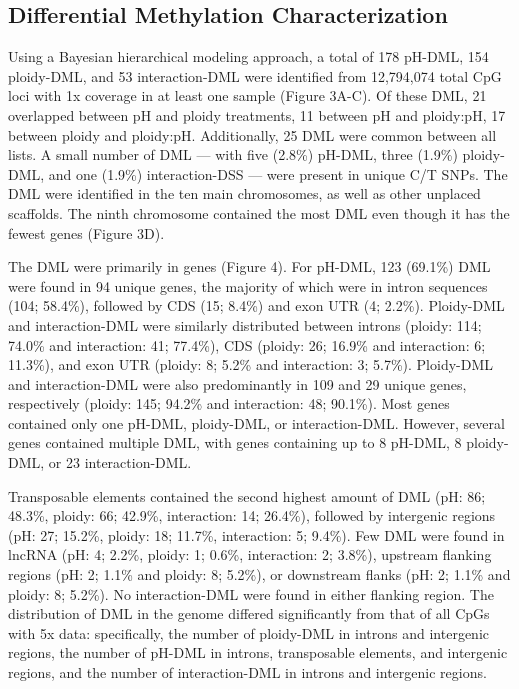 \documentclass [11pt, proquest] {uwthesis}[2015/03/03]
\begin{document}
\hypertarget{differential-methylation-characterization}{%
\subsection{Differential Methylation Characterization}\label{differential-methylation-characterization}}

Using a Bayesian hierarchical modeling approach, a total of 178 pH-DML, 154 ploidy-DML, and 53 interaction-DML were identified from 12,794,074 total CpG loci with 1x coverage in at least one sample (Figure 3A-C). Of these DML, 21 overlapped between pH and ploidy treatments, 11 between pH and ploidy:pH, 17 between ploidy and ploidy:pH. Additionally, 25 DML were common between all lists. A small number of DML --- with five (2.8\%) pH-DML, three (1.9\%) ploidy-DML, and one (1.9\%) interaction-DSS --- were present in unique C/T SNPs. The DML were identified in the ten main chromosomes, as well as other unplaced scaffolds. The ninth chromosome contained the most DML even though it has the fewest genes (Figure 3D).

The DML were primarily in genes (Figure 4). For pH-DML, 123 (69.1\%) DML were found in 94 unique genes, the majority of which were in intron sequences (104; 58.4\%), followed by CDS (15; 8.4\%) and exon UTR (4; 2.2\%). Ploidy-DML and interaction-DML were similarly distributed between introns (ploidy: 114; 74.0\% and interaction: 41; 77.4\%), CDS (ploidy: 26; 16.9\% and interaction: 6; 11.3\%), and exon UTR (ploidy: 8; 5.2\% and interaction: 3; 5.7\%). Ploidy-DML and interaction-DML were also predominantly in 109 and 29 unique genes, respectively (ploidy: 145; 94.2\% and interaction: 48; 90.1\%). Most genes contained only one pH-DML, ploidy-DML, or interaction-DML. However, several genes contained multiple DML, with genes containing up to 8 pH-DML, 8 ploidy-DML, or 23 interaction-DML.

Transposable elements contained the second highest amount of DML (pH: 86; 48.3\%, ploidy: 66; 42.9\%, interaction: 14; 26.4\%), followed by intergenic regions (pH: 27; 15.2\%, ploidy: 18; 11.7\%, interaction: 5; 9.4\%). Few DML were found in lncRNA (pH: 4; 2.2\%, ploidy: 1; 0.6\%, interaction: 2; 3.8\%), upstream flanking regions (pH: 2; 1.1\% and ploidy: 8; 5.2\%), or downstream flanks (pH: 2; 1.1\% and ploidy: 8; 5.2\%). No interaction-DML were found in either flanking region. The distribution of DML in the genome differed significantly from that of all CpGs with 5x data: specifically, the number of ploidy-DML in introns and intergenic regions, the number of pH-DML in introns, transposable elements, and intergenic regions, and the number of interaction-DML in introns and intergenic regions.
\end{document}

